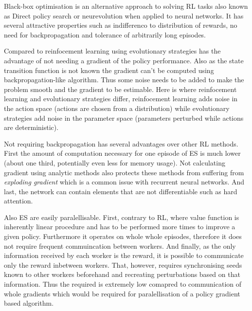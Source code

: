 Black-box optimisation is an alternative approach to solving RL tasks also known as Direct policy search or neurevolution when applied to neural networks. It has several attractive properties such as indifferenco to distribution of rewards, no need for backpropagation and tolerance of arbitrarily long episodes.

Compared to reinfocement learning using evolutionary strategies has the advantage of not needing a gradient of the policy performance. Also as the state transition function is not known  the gradient can't be computed using backpropagation-like algorithm. Thus some noise needs to be added to make the problem smooth and the gradient to be estimable. Here is where reinfocement learning and evolutionary strategies differ, reinfocement learning adds noise in the action space (actions are chosen from a distribution) while evolutionary strategies add noise in the parameter space (parameters perturbed while actions are deterministic).

Not requiring backpropagation has several advantages over other RL methods. First the amount of computation necessary for one episode of ES is much lower (about one third, potentially even less for memory usage). Not calculating gradient using analytic methods also protects these methods from suffering from \emph{exploding gradient} which is a common issue with recurrent neural networks. And last, the network can contain elements that are not differentiable such as hard attention.

Also ES are easily paralellisable. First, contrary to RL, where value function is inherently linear procedure and has to be performed more times to improve a given policy. Furthermore it operates on whole whole episodes, therefore it does not require frequent commuincation between workers. And finally, as the only information received by each worker is the reward, it is possible to communicate only the reward inbetween workers. That, however, requires synchronising seeds known to other workers beforehand and recreating perturbations based on that information. Thus the required is extremely low comapred to communication of whole gradients which would be required for paralellisation of a policy gradient based algorithm.

